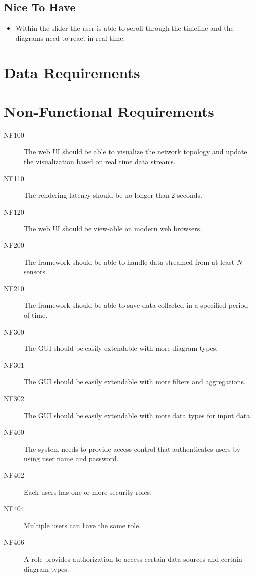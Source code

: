 \documentclass[twoside, english, draft]{Pflichtenheft}
\begin{document}
\subsection{Nice To Have}
\begin{itemize}
\item{Within the slider the user is able to scroll through the timeline and the diagrams need to react in real-time.
}
\end{itemize}

\section{Data Requirements}
\section{Non-Functional Requirements}

\begin{description}
  \item[NF100]
  The web UI should be able to visualize the network topology and update the visualization based on real time data streams.
  
  \item[NF110]
  The rendering latency should be no longer than 2 seconds.

  \item[NF120]
  The web UI should be view-able on modern web browsers.

  \item[NF200]
  The framework should be able to handle data streamed from at least $\mathit{N}$ sensors.

  \item[NF210]
  The framework should be able to save data collected in a specified period of time.

  \item[NF300]
  The GUI should be easily extendable with more diagram types.

  \item[NF301]
  The GUI should be easily extendable with more filters and aggregations.

  \item[NF302]
  The GUI should be easily extendable with more data types for input data.

  \item[NF400]
  The system needs to provide access control that authenticates users by using user name and password.

  \item[NF402]
  Each users has one or more security \glspl{role}.

  \item[NF404]
  Multiple users can have the same role.

  \item[NF406]
  A role provides authorization to access certain \glspl{data source} and certain \glspl{diagram type}.

  
\end{description}
\end{document}

